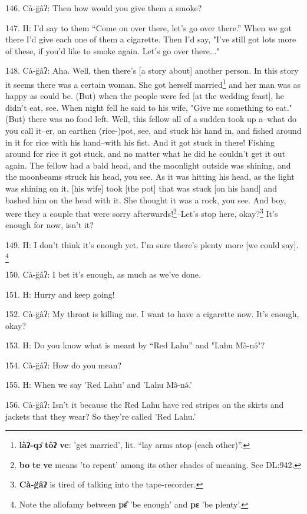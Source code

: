 146. Cà-g̈âʔ: Then how would you give them a smoke?

147. H: I'd say to them ``Come on over there, let's go over there.''
When we got there I'd give each one of them a cigarette. Then I'd say, "I've
still got lots more of these, if you'd like to smoke again. Let's go over there..."

148. Cà-g̈âʔ: Aha. Well, then there's [a story about] another person. In this
story it seems there was a certain woman. She got herself married\footnote{\textbf{làʔ-qɔ̄} \textbf{tôʔ} \textbf{ve}: 'get married', lit. ``lay arms atop (each other)''.} and her
man was as happy as could be. (But) when the people were fed [at the wedding feast],
he didn't eat, see. When night fell he said to his wife, "Give me something
to eat." (But) there was no food left. Well, this fellow all of a sudden
took up a--what do you call it--er, an earthen (rice-)pot, see, and stuck his hand
in, and fished around in it for rice with his hand--with his fist. And it got stuck
in there! Fishing around for rice it got stuck, and no matter what he did he couldn't
get it out again. The fellow had a bald head, and the moonlight outside was shining,
and the moonbeams struck his head, you see. As it was hitting his head, as the
light was shining on it, [his wife] took [the pot] that was stuck [on his hand]
and bashed him on the head with it. She thought it was a rock, you see. And boy,
were they a couple that were sorry afterwards!\footnote{\textbf{bo} \textbf{te} \textbf{ve} means 'to repent' among its other shades of meaning. See DL:942.}--Let's stop here, okay?\footnote{\textbf{Cà-g̈âʔ} is tired of talking into the tape-recorder.}
It's enough for now, isn't it?

149. H: I don't think it's enough yet. I'm sure there's plenty more [we could say].
\footnote{Note the allofamy between \textbf{pɛ̂} 'be enough' and \textbf{pɛ} 'be plenty'.}

150. Cà-g̈âʔ: I bet it's enough, as much as we've done.

151. H: Hurry and keep going!

152. Cà-g̈âʔ: My throat is killing me. I want to have a cigarette now. It's
enough, okay?

153. H: Do you know what is meant by ``Red Lahu'' and "Lahu
Mə̂-nə́"?

154. Cà-g̈âʔ: How do you mean?

155. H: When we say 'Red Lahu' and 'Lahu Mə̂-nə́.'

156. Cà-g̈âʔ: Isn't it because the Red Lahu have red stripes on the skirts
and jackets that they wear? So they're called 'Red Lahu.'


